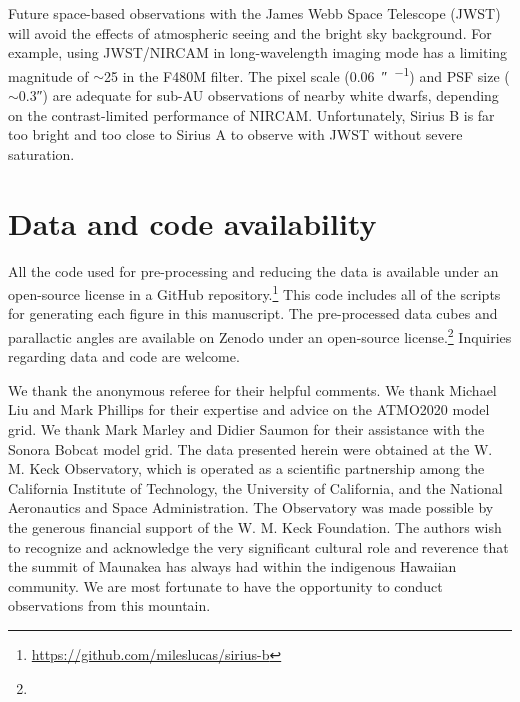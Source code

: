 \documentclass[twocolumn]{aastex631}
\begin{document}
Future space-based observations with the James Webb Space Telescope (JWST) will avoid the effects of atmospheric seeing and the bright sky background. For example, using JWST/NIRCAM in long-wavelength imaging mode has a limiting magnitude of $\sim$25 in the F480M filter. The pixel scale (\qty{0.06}{\arcsecond\per\pixel}) and PSF size ($\sim$\ang{;;0.3}) are adequate for sub-AU observations of nearby white dwarfs, depending on the contrast-limited performance of NIRCAM. Unfortunately, Sirius B is far too bright and too close to Sirius A to observe with JWST without severe saturation.


\section{Data and code availability}\label{sec:data}

All the code used for pre-processing and reducing the data is available under an open-source license in a GitHub repository.\footnote{\url{https://github.com/mileslucas/sirius-b}} This code includes all of the scripts for generating each figure in this manuscript. The pre-processed data cubes and parallactic angles are available on Zenodo under an open-source license.\footnote{} Inquiries regarding data and code are welcome.

\begin{acknowledgements}
We thank the anonymous referee for their helpful comments. We thank Michael Liu and Mark Phillips for their expertise and advice on the ATMO2020 model grid. We thank Mark Marley and Didier Saumon for their assistance with the Sonora Bobcat model grid. The data presented herein were obtained at the W. M. Keck Observatory, which is operated as a scientific partnership among the California Institute of Technology, the University of California, and the National Aeronautics and Space Administration. The Observatory was made possible by the generous financial support of the W. M. Keck Foundation. The authors wish to recognize and acknowledge the very significant cultural role and reverence that the summit of Maunakea has always had within the indigenous Hawaiian community. We are most fortunate to have the opportunity to conduct observations from this mountain.
\end{acknowledgements}



\end{document}
